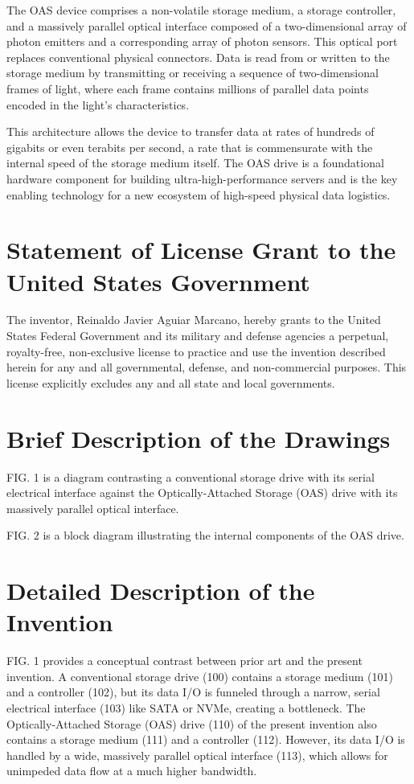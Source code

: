 \documentclass[11pt,letterpaper]{article}
\begin{document}
The OAS device comprises a non-volatile storage medium, a storage controller, and a massively parallel optical interface composed of a two-dimensional array of photon emitters and a corresponding array of photon sensors. This optical port replaces conventional physical connectors. Data is read from or written to the storage medium by transmitting or receiving a sequence of two-dimensional frames of light, where each frame contains millions of parallel data points encoded in the light's characteristics.

This architecture allows the device to transfer data at rates of hundreds of gigabits or even terabits per second, a rate that is commensurate with the internal speed of the storage medium itself. The OAS drive is a foundational hardware component for building ultra-high-performance servers and is the key enabling technology for a new ecosystem of high-speed physical data logistics.

\section*{Statement of License Grant to the United States Government}

The inventor, Reinaldo Javier Aguiar Marcano, hereby grants to the United States Federal Government and its military and defense agencies a perpetual, royalty-free, non-exclusive license to practice and use the invention described herein for any and all governmental, defense, and non-commercial purposes. This license explicitly excludes any and all state and local governments.

\section*{Brief Description of the Drawings}

FIG. 1 is a diagram contrasting a conventional storage drive with its serial electrical interface against the Optically-Attached Storage (OAS) drive with its massively parallel optical interface.

FIG. 2 is a block diagram illustrating the internal components of the OAS drive.

\section*{Detailed Description of the Invention}

FIG. 1 provides a conceptual contrast between prior art and the present invention. A conventional storage drive (100) contains a storage medium (101) and a controller (102), but its data I/O is funneled through a narrow, serial electrical interface (103) like SATA or NVMe, creating a bottleneck. The Optically-Attached Storage (OAS) drive (110) of the present invention also contains a storage medium (111) and a controller (112). However, its data I/O is handled by a wide, massively parallel optical interface (113), which allows for unimpeded data flow at a much higher bandwidth.
\end{document}
